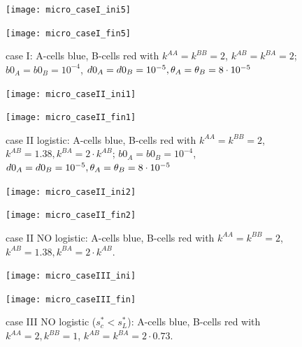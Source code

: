 \begin{figure}[htb]
	\begin{minipage}[t]{.45\textwidth}
		\centering
		\texttt{[image: micro\_caseI\_ini5]}
	\end{minipage}
	\hfill
	\begin{minipage}[t]{.45\textwidth}
		\centering
		\texttt{[image: micro\_caseI\_fin5]}
	\end{minipage}  
	\label{fig:1-2}
	\caption{{case I: A-cells blue, B-cells red with $k^{AA}=k^{BB}=2 $, $k^{AB}=k^{BA}=2$; $b0_A=b0_B=10^{-4}$, $d0_A=d0_B=10^{-5}, {\theta}_A={\theta}_B=8\cdot 10^{-5}$}}
\end{figure}



\begin{figure}[htb]
	\begin{minipage}[t]{.45\textwidth}
		\centering
		\texttt{[image: micro\_caseII\_ini1]}
	\end{minipage}
	\hfill
	\begin{minipage}[t]{.45\textwidth}
		\centering
		\texttt{[image: micro\_caseII\_fin1]}
	\end{minipage}  
	\label{fig:1-2}
	\caption{{case II logistic: A-cells blue, B-cells red with $k^{AA}=k^{BB}=2 $, $k^{AB}=1.38, k^{BA}=2\cdot k^{AB}$; $b0_A=b0_B=10^{-4}$, $d0_A=d0_B=10^{-5}, {\theta}_A={\theta}_B=8\cdot 10^{-5}$}}
\end{figure}


\begin{figure}[htb]
	\begin{minipage}[t]{.45\textwidth}
		\centering
		\texttt{[image: micro\_caseII\_ini2]}
	\end{minipage}
	\hfill
	\begin{minipage}[t]{.45\textwidth}
		\centering
		\texttt{[image: micro\_caseII\_fin2]}
	\end{minipage}  
	\label{fig:1-2}
	\caption{{case II NO logistic: A-cells blue, B-cells red with $k^{AA}=k^{BB}=2 $, $k^{AB}=1.38, k^{BA}=2\cdot k^{AB}$.}}
\end{figure}


\begin{figure}[htb]
	\begin{minipage}[t]{.45\textwidth}
		\centering
		\texttt{[image: micro\_caseIII\_ini]}
	\end{minipage}
	\hfill
	\begin{minipage}[t]{.45\textwidth}
		\centering
		\texttt{[image: micro\_caseIII\_fin]}
	\end{minipage}  
	\label{fig:1-2}
	\caption{{case III NO logistic ($s^{*}_{c} < s^{*}_{L}$): A-cells blue, B-cells red with $k^{AA}=2, k^{BB}=1 $, $k^{AB}=k^{BA}=2\cdot 0.73$.}}
\end{figure}




